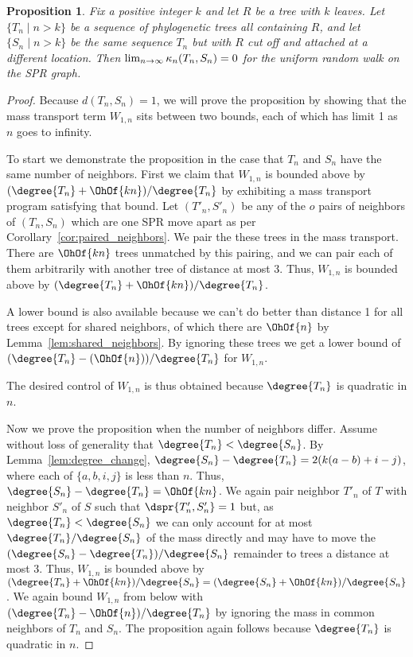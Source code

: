 \documentclass{amsart}
\newtheorem{proposition}[theorem]{Proposition}
\newcommand{\curvature}[2][]{%
    \ifthenelse{\equal{#1}{}}%
		{\kappa_n(#2)}%
		{\kappa_n(#1;#2)}%
}
\begin{document}
\begin{proposition}
Fix a positive integer $k$ and let $R$ be a tree with $k$ leaves.
Let $\{T_n \mid n > k\}$ be a sequence of phylogenetic trees all containing $R$, and let $\{S_n \mid n > k\}$ be the same sequence $T_n$ but with $R$ cut off and attached at a different location.
Then $\lim_{n \rightarrow \infty} \curvature{T_n,S_n} = 0$ for the uniform random walk on the SPR graph.
\end{proposition}
\begin{proof}
Because $d(T_n, S_n) = 1$, we will prove the proposition by showing that the mass transport term $W_{1,n}$ sits between two bounds, each of which has limit 1 as $n$ goes to infinity.

To start we demonstrate the proposition in the case that $T_n$ and $S_n$ have the same number of neighbors.
First we claim that $W_{1,n}$ is bounded above by $(\degree{T_n}+\OhOf{kn})/\degree{T_n}$ by exhibiting a mass transport program satisfying that bound.
Let $(T'_n, S'_n)$ be any of the $o$ pairs of neighbors of $(T_n, S_n)$ which are one SPR move apart as per Corollary~\ref{cor:paired_neighbors}.
We pair the these trees in the mass transport.
There are $\OhOf{kn}$ trees unmatched by this pairing, and we can pair each of them arbitrarily with another tree of distance at most 3.
Thus, $W_{1,n}$ is bounded above by $(\degree{T_n} + \OhOf{kn}) / \degree{T_n}$.

A lower bound is also available because we can't do better than distance 1 for all trees except for shared neighbors, of which there are $\OhOf{n}$ by Lemma~\ref{lem:shared_neighbors}.
By ignoring these trees we get a lower bound of $(\degree{T_n} - (\OhOf{n}))/\degree{T_n}$ for $W_{1,n}$.

The desired control of $W_{1,n}$ is thus obtained because $\degree{T_n}$ is quadratic in $n$.

Now we prove the proposition when the number of neighbors differ.
Assume without loss of generality that $\degree{T_n} < \degree{S_n}$.
By Lemma~\ref{lem:degree_change}, $\degree{S_n} - \degree{T_n} = 2(k(a-b) + i - j)$, where each of $\{a,b,i,j\}$ is less than $n$.
Thus, $\degree{S_n} - \degree{T_n} = \OhOf{kn}$.
We again pair neighbor $T'_n$ of $T$ with neighbor $S'_n$ of $S$ such that $\dspr{T'_n, S'_n}=1$ but, as $\degree{T_n} < \degree{S_n}$ we can only account for at most $\degree{T_n} / \degree{S_n}$ of the mass directly and may have to move the $(\degree{S_n} - \degree{T_n}) / \degree{S_n}$ remainder to trees a distance at most 3.
Thus, $W_{1,n}$ is bounded above by $(\degree{T_n} + \OhOf{kn}) / \degree{S_n} = (\degree{S_n} + \OhOf{kn}) / \degree{S_n}$.
We again bound $W_{1,n}$ from below with $(\degree{T_n} - \OhOf{n}) / \degree{T_n}$ by ignoring the mass in common neighbors of $T_n$ and $S_n$.
The proposition again follows because $\degree{T_n}$ is quadratic in $n$.

\end{proof}
\end{document}
